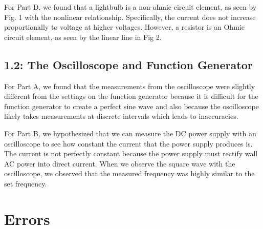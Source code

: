 \documentclass[10pt]{article}
\begin{document}
	For Part D, we found that a lightbulb is a non-ohmic circuit element, as seen by Fig. 1 with the nonlinear relationship. Specifically, the current does not increase proportionally to voltage at higher voltages. 
	However, a resistor is an Ohmic circuit element, as seen by the linear line in Fig 2.
	
	\subsection{1.2: The Oscilloscope and Function Generator}
	For Part A, we found that the measurements from the oscilloscope were slightly different from the settings on the function generator because it is difficult for the function generator to create a perfect sine wave and also because the oscilloscope likely takes measurements at discrete intervals which leads to inaccuracies. \newline
	
	For Part B, we hypothesized that we can measure the DC power supply with an oscilloscope to see how constant the current that the power supply produces is. The current is not perfectly constant because the power supply must rectify wall AC power into direct current. When we observe the square wave with the oscilloscope, we observed that the measured frequency was highly similar to the set frequency. 
	
	
	\medskip
	
	
	\section{Errors}
	
	
	
	\medskip
	
	
\end{document}
